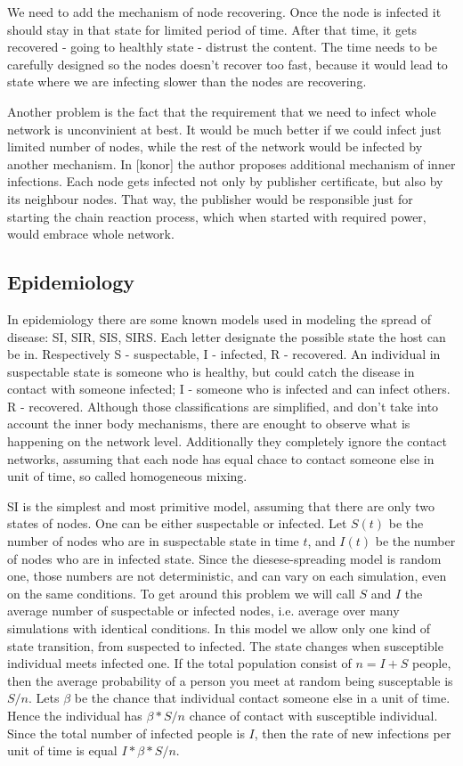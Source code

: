 \documentclass[nostrict]{szablonPG}
\begin{document}
We need to add the mechanism of node recovering. Once the node is infected it should stay in that state for limited period of time. After that time, it gets recovered - going to healthly state - distrust the content. The time needs to be carefully designed so the nodes doesn't recover too fast, because it would lead to state where we are infecting slower than the nodes are recovering. 

Another problem is the fact that the requirement that we need to infect whole network is unconvinient at best. It would be much better if we could infect just limited number of nodes, while the rest of the network would be infected by another mechanism.
In [konor] the author proposes additional mechanism of inner infections. Each node gets infected not only by publisher certificate, but also by its neighbour nodes. That way, the publisher would be responsible just for starting the chain reaction process, which when started with required power, would embrace whole network. 

\subsection{Epidemiology}
In epidemiology there are some known models used in modeling the spread of disease: SI, SIR, SIS, SIRS. Each letter designate the possible state the host can be in. Respectively S - suspectable, I - infected, R - recovered. An individual in suspectable state is someone who is healthy, but could catch the disease in contact with someone infected; I - someone who is infected and can infect others. R - recovered. Although those classifications are simplified, and don't take into account the inner body mechanisms, there are enought to observe what is happening on the network level. Additionally they completely ignore the contact networks, assuming that each node has equal chace to contact someone else in unit of time, so called homogeneous mixing.

SI is the simplest and most primitive model, assuming that there are only two states of nodes. One can be either suspectable or infected. Let $S(t)$ be the number of nodes who are in suspectable state in time $t$, and $I(t)$ be the number of nodes who are in infected state. Since the diesese-spreading model is random one, those numbers are not deterministic, and can vary on each simulation, even on the same conditions. To get around this problem we will call $S$ and $I$ the average number of suspectable or infected nodes, i.e. average over many simulations with identical conditions.
In this model we allow only one kind of state transition, from suspected to infected. The state changes when susceptible individual meets infected one. If the total population consist of $n = I + S$ people, then the average probability of a person you meet at random being susceptable is $S/n$.
Lets $\beta$ be the chance that individual contact someone else in a unit of time. 
Hence the individual has $\beta*S/n$ chance of contact with susceptible individual.
Since the total number of infected people is $I$, then the rate of new infections per unit of time is equal $I * \beta*S/n$.
\end{document}
